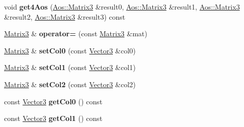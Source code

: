 \begin{DoxyCompactItemize}
\item 
\hypertarget{classVectormath_1_1Soa_1_1Matrix3_a278c7feaa14eb851d391d316fea80914}{void {\bfseries get4\-Aos} (\hyperlink{classVectormath_1_1Aos_1_1Matrix3}{Aos\-::\-Matrix3} \&result0, \hyperlink{classVectormath_1_1Aos_1_1Matrix3}{Aos\-::\-Matrix3} \&result1, \hyperlink{classVectormath_1_1Aos_1_1Matrix3}{Aos\-::\-Matrix3} \&result2, \hyperlink{classVectormath_1_1Aos_1_1Matrix3}{Aos\-::\-Matrix3} \&result3) const }\label{classVectormath_1_1Soa_1_1Matrix3_a278c7feaa14eb851d391d316fea80914}

\item 
\hypertarget{classVectormath_1_1Soa_1_1Matrix3_aeef21e8bebf5c9d2d5e77920db0d6fbb}{\hyperlink{classVectormath_1_1Soa_1_1Matrix3}{Matrix3} \& {\bfseries operator=} (const \hyperlink{classVectormath_1_1Soa_1_1Matrix3}{Matrix3} \&mat)}\label{classVectormath_1_1Soa_1_1Matrix3_aeef21e8bebf5c9d2d5e77920db0d6fbb}

\item 
\hypertarget{classVectormath_1_1Soa_1_1Matrix3_a76a69e5bc5a4d24dcc5b3e45bcd21632}{\hyperlink{classVectormath_1_1Soa_1_1Matrix3}{Matrix3} \& {\bfseries set\-Col0} (const \hyperlink{classVectormath_1_1Soa_1_1Vector3}{Vector3} \&col0)}\label{classVectormath_1_1Soa_1_1Matrix3_a76a69e5bc5a4d24dcc5b3e45bcd21632}

\item 
\hypertarget{classVectormath_1_1Soa_1_1Matrix3_a9bb31be43440f4aff3149409e000e38f}{\hyperlink{classVectormath_1_1Soa_1_1Matrix3}{Matrix3} \& {\bfseries set\-Col1} (const \hyperlink{classVectormath_1_1Soa_1_1Vector3}{Vector3} \&col1)}\label{classVectormath_1_1Soa_1_1Matrix3_a9bb31be43440f4aff3149409e000e38f}

\item 
\hypertarget{classVectormath_1_1Soa_1_1Matrix3_a3c3827a1a7c32b31ebd500b38f35827d}{\hyperlink{classVectormath_1_1Soa_1_1Matrix3}{Matrix3} \& {\bfseries set\-Col2} (const \hyperlink{classVectormath_1_1Soa_1_1Vector3}{Vector3} \&col2)}\label{classVectormath_1_1Soa_1_1Matrix3_a3c3827a1a7c32b31ebd500b38f35827d}

\item 
\hypertarget{classVectormath_1_1Soa_1_1Matrix3_a7a3a4ff5f71704fd50daa98d3ef842a5}{const \hyperlink{classVectormath_1_1Soa_1_1Vector3}{Vector3} {\bfseries get\-Col0} () const }\label{classVectormath_1_1Soa_1_1Matrix3_a7a3a4ff5f71704fd50daa98d3ef842a5}

\item 
\hypertarget{classVectormath_1_1Soa_1_1Matrix3_a9aa76204f90b6c6a9f9d6684164886bf}{const \hyperlink{classVectormath_1_1Soa_1_1Vector3}{Vector3} {\bfseries get\-Col1} () const }\label{classVectormath_1_1Soa_1_1Matrix3_a9aa76204f90b6c6a9f9d6684164886bf}


\end{DoxyCompactItemize}
